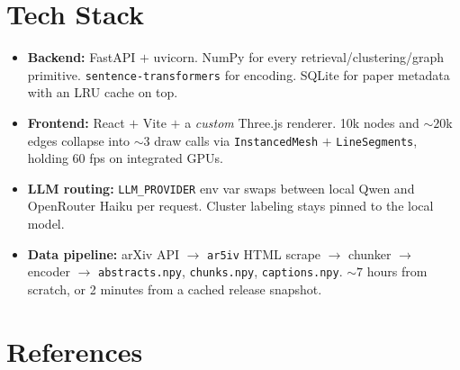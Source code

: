 \documentclass[11pt]{article}
\begin{document}
\section{Tech Stack}

\begin{itemize}[noitemsep]
    \item \textbf{Backend:} FastAPI $+$ uvicorn. NumPy for every retrieval/clustering/graph
          primitive. \texttt{sentence-transformers} for encoding. SQLite for paper metadata
          with an LRU cache on top.
    \item \textbf{Frontend:} React $+$ Vite $+$ a \emph{custom} Three.js renderer.
          10k nodes and $\sim 20$k edges collapse into $\sim 3$ draw calls via
          \texttt{InstancedMesh} $+$ \texttt{LineSegments}, holding 60 fps on integrated GPUs.
    \item \textbf{LLM routing:} \texttt{LLM\_PROVIDER} env var swaps between local Qwen
          and OpenRouter Haiku per request. Cluster labeling stays pinned to the local model.
    \item \textbf{Data pipeline:} arXiv API $\to$ \texttt{ar5iv} HTML scrape $\to$ chunker
          $\to$ encoder $\to$ \texttt{abstracts.npy}, \texttt{chunks.npy}, \texttt{captions.npy}.
          $\sim 7$ hours from scratch, or 2 minutes from a cached release snapshot.
\end{itemize}

\section{References}
\begin{itemize}[noitemsep]
\end{itemize}
\end{document}
